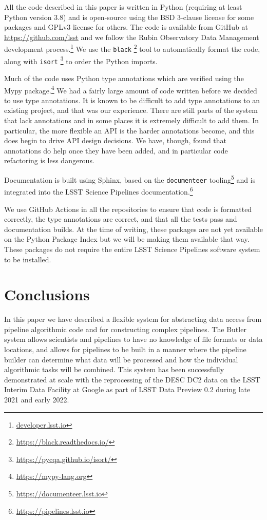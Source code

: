 \documentclass[]{spie}
\begin{document}
All the code described in this paper is written in Python (requiring at least Python version 3.8\cite{2020ASPC..522..541J}) and is open-source using the BSD 3-clause license for some packages and GPLv3 license for others.
The code is available from GitHub at \url{https://github.com/lsst} and we follow the Rubin Observatory Data Management development process.\footnote{\url{developer.lsst.io}}\cite{2018SPIE10707E..09J}
We use the \texttt{black} \footnote{\url{https://black.readthedocs.io/}} tool to automatically format the code, along with \texttt{isort} \footnote{\url{https://pycqa.github.io/isort/}} to order the Python imports.

Much of the code uses Python type annotations which are verified using the Mypy package.\footnote{\url{https://mypy-lang.org}}
We had a fairly large amount of code written before we decided to use type annotations.
It is known to be difficult to add type annotations to an existing project\cite{10.1109/ASE51524.2021.9678947}, and that was our experience.
There are still parts of the system that lack annotations and in some places it is extremely difficult to add them.
In particular, the more flexible an API is the harder annotations become, and this does begin to drive API design decisions.
We have, though, found that annotations do help once they have been added, and in particular code refactoring is less dangerous.

Documentation is built using Sphinx, based on the \texttt{documenteer} tooling\footnote{\url{https://documenteer.lsst.io}} and is integrated into the LSST Science Pipelines documentation.\footnote{\url{https://pipelines.lsst.io}}

We use GitHub Actions in all the repositories to ensure that code is formatted correctly, the type annotations are correct, and that all the tests pass and documentation builds.
At the time of writing, these packages are not yet available on the Python Package Index but we will be making them available that way.
These packages do not require the entire LSST Science Pipelines software system to be installed.

\section{Conclusions}

In this paper we have described a flexible system for abstracting data access from pipeline algorithmic code and for constructing complex pipelines.
The Butler system allows scientists and pipelines to have no knowledge of file formats or data locations, and allows for pipelines to be built in a manner where the pipeline builder can determine what data will be processed and how the individual algorithmic tasks will be combined.
This system has been successfully demonstrated at scale with the reprocessing of the DESC DC2 data\cite{2021ApJS..253...31L} on the LSST Interim Data Facility at Google \cite{2021arXiv211115030O} as part of LSST Data Preview 0.2 \cite{RTN-001} during late 2021 and early 2022.
\end{document}
